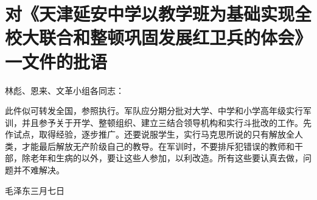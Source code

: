 \section[对《天津延安中学以教学班为基础实现全校大联合和整顿巩固发展红卫兵的体会》一文件的批语（一九六七年三月七日）]{对《天津延安中学以教学班为基础实现全校大联合和整顿巩固发展红卫兵的体会》一文件的批语}


林彪、恩来、文革小组各同志：

此件似可转发全国，参照执行。军队应分期分批对大学、中学和小学高年级实行军训，并且参予关于开学、整顿组织、建立三结合领导机构和实行斗批改的工作。先作试点，取得经验，逐步推广。还要说服学生，实行马克思所说的只有解放全人类，才能最后解放无产阶级自己的教导。在军训时，不要排斥犯错误的教师和干部，除老年和生病的以外，要让这些人参加，以利改造。所有这些要认真去做，问题并不难解决。
{\raggedleft 毛泽东三月七日\par}


